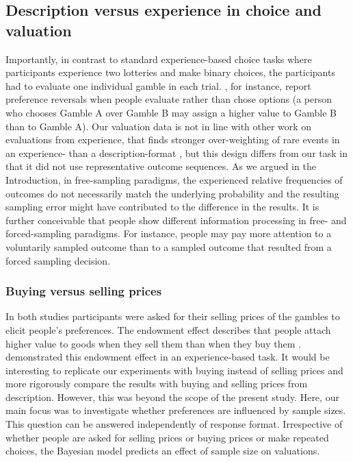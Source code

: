 \documentclass[a4paper, man, natbib, floatsintext]{apa6}
\begin{document}
\subsection{Description versus experience in choice and valuation}
Importantly, in contrast to standard experience-based choice tasks where participants experience two lotteries and make binary choices, the participants had to evaluate one individual gamble in each trial. \cite{Lichtenstein1971}, for instance, report preference reversals when people evaluate rather than chose options (a person who chooses Gamble A over Gamble B may assign a higher value to Gamble B than to Gamble A). Our valuation data is not in line with other work on evaluations from experience, that finds stronger over-weighting of rare events in an experience- than a description-format \citep{Golan2014}, but this design differs from our task in that it did not use representative outcome sequences. As we argued in the Introduction, in free-sampling paradigms, the experienced relative frequencies of outcomes do not necessarily match the underlying probability and the resulting sampling error might have contributed to the difference in the results. It is further conceivable that people show different information processing in free- and forced-sampling paradigms. For instance, people may pay more attention to a voluntarily sampled outcome than to a sampled outcome that resulted from a forced sampling decision.

\subsubsection{Buying versus selling prices}
In both studies participants were asked for their selling prices of the gambles to elicit people's preferences. The endowment effect describes that people attach higher value to goods when they sell them than when they buy them \citep{Thaler1980}. \cite{Pachur2012} demonstrated this endowment effect in an experience-based task. It would be interesting to replicate our experiments with buying instead of selling prices and more rigorously compare the results with buying and selling prices from description. However, this was beyond the scope of the present study. Here, our main focus was to investigate whether preferences are influenced by sample sizes. This question can be answered independently of response format. Irrespective of whether people are asked for selling prices or buying prices or make repeated choices, the Bayesian model predicts an effect of sample size on valuations. 
\end{document}
